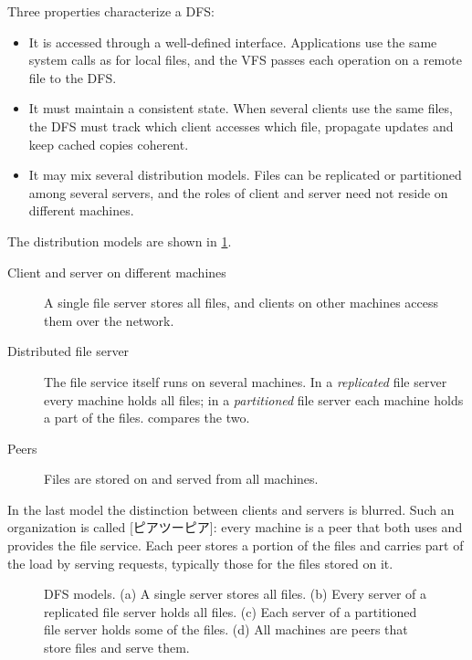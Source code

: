 \documentclass[../main.tex]{subfiles}
\begin{document}
Three properties characterize a DFS:
\begin{itemize}
  \item It is accessed through a well-defined interface.  Applications use
    the same system calls as for local files, and the VFS passes each
    operation on a remote file to the DFS.
  \item It must maintain a consistent state.  When several clients use the
    same files, the DFS must track which client accesses which file,
    propagate updates and keep cached copies coherent.
  \item It may mix several distribution models.  Files can be replicated or
    partitioned among several servers, and the roles of client and server
    need not reside on different machines.
\end{itemize}

The distribution models are shown in \cref{fig:l14-models}.
\begin{description}
  \item[Client and server on different machines] A single file server
    stores all files, and clients on other machines access them over the
    network.
  \item[Distributed file server] The file service itself runs on several
    machines.  In a \emph{replicated} file server every machine holds all
    files; in a \emph{partitioned} file server each machine holds a part of
    the files.   compares the two.
  \item[Peers] Files are stored on and served from all machines.
\end{description}

In the last model the distinction between clients and servers is blurred.
Such an organization is called [ピアツーピア]: every
machine is a peer that both uses and provides the file service.  Each peer
stores a portion of the files and carries part of the load by serving
requests, typically those for the files stored on it.

\begin{figure}[htbp]
  \centering
  
  \caption{DFS models.  (a) A single server stores all files.  (b) Every
    server of a replicated file server holds all files.  (c) Each server of
    a partitioned file server holds some of the files.  (d) All machines
    are peers that store files and serve them.}
  \label{fig:l14-models}
\end{figure}
\end{document}
